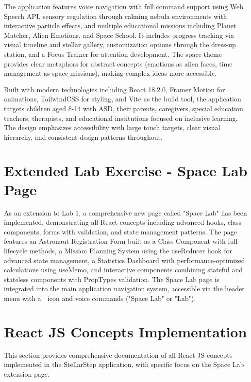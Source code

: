 \documentclass[12pt,a4paper]{article}
\begin{document}
The application features voice navigation with full command support using Web Speech API, sensory regulation through calming nebula environments with interactive particle effects, and multiple educational missions including Planet Matcher, Alien Emotions, and Space School. It includes progress tracking via visual timeline and stellar gallery, customization options through the dress-up station, and a Focus Trainer for attention development. The space theme provides clear metaphors for abstract concepts (emotions as alien faces, time management as space missions), making complex ideas more accessible.

Built with modern technologies including React 18.2.0, Framer Motion for animations, TailwindCSS for styling, and Vite as the build tool, the application targets children aged 8-14 with ASD, their parents, caregivers, special education teachers, therapists, and educational institutions focused on inclusive learning. The design emphasizes accessibility with large touch targets, clear visual hierarchy, and consistent design patterns throughout.

\section{Extended Lab Exercise - Space Lab Page}

As an extension to Lab 1, a comprehensive new page called "Space Lab" has been implemented, demonstrating all React concepts including advanced hooks, class components, forms with validation, and state management patterns. The page features an Astronaut Registration Form built as a Class Component with full lifecycle methods, a Mission Planning System using the useReducer hook for advanced state management, a Statistics Dashboard with performance-optimized calculations using useMemo, and interactive components combining stateful and stateless components with PropTypes validation. The Space Lab page is integrated into the main application navigation system, accessible via the header menu with a 🔬 icon and voice commands ("Space Lab" or "Lab").

\newpage

\section{React JS Concepts Implementation}

This section provides comprehensive documentation of all React JS concepts implemented in the StellarStep application, with specific focus on the Space Lab extension page.
\end{document}
